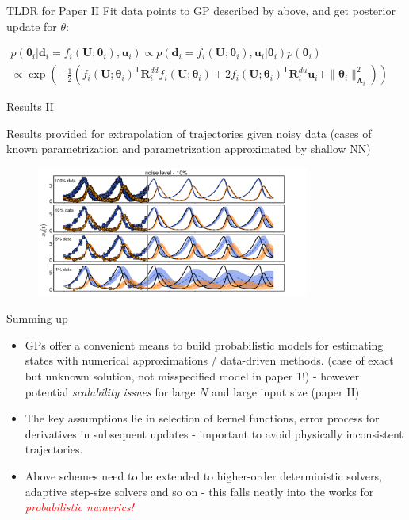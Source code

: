\documentclass[usenames,dvipsnames]{beamer}
\theoremstyle{definition}
\begin{document}
\begin{frame}{TLDR for Paper II}
    Fit data points to GP described by above, and get posterior update for $\theta$:

    $\begin{gathered}p\left(\boldsymbol{\theta}_i|\mathbf{d}_i=f_i(\mathbf{U};\boldsymbol{\theta}_i),\mathbf{u}_i\right)\propto p\left(\mathbf{d}_i=f_i(\mathbf{U};\boldsymbol{\theta}_i),\mathbf{u}_i|\left.\boldsymbol{\theta}_i\right)p(\boldsymbol{\theta}_i)\right.\\\propto \exp\left(-\frac12\left(f_i(\mathbf{U};\boldsymbol{\theta}_i)^\mathsf{T}\mathbf{R}_i^{dd}f_i(\mathbf{U};\boldsymbol{\theta}_i)+2f_i(\mathbf{U};\boldsymbol{\theta}_i)^\mathsf{T}\mathbf{R}_i^{du}\mathbf{u}_i+\|\boldsymbol{\theta}_i\|_{\boldsymbol{\Lambda}_i}^2\right)\right)\end{gathered}$
    
\end{frame}

\begin{frame}{Results II}
    
Results provided for extrapolation of trajectories given noisy data (cases of known parametrization and parametrization approximated by shallow NN)

\begin{figure}
    \centering
    \includegraphics[width=0.8\textwidth]{noisy_data_reconstruction.png}
    \label{f: noisy_uc}
\end{figure}
\end{frame}

\begin{frame}{Summing up}
\begin{itemize}
\item GPs offer a convenient means to build probabilistic models for estimating states with numerical approximations / data-driven methods. (case of exact but unknown solution, not misspecified model in paper 1!) - however potential \emph{scalability issues} for large $N$ and large input size (paper II)

\item The key assumptions lie in selection of kernel functions, error process for derivatives in subsequent updates - important to avoid physically inconsistent trajectories.

\item Above schemes need to be extended to higher-order deterministic solvers, adaptive step-size solvers and so on - this falls neatly into the works for \textcolor{red}{\emph{probabilistic numerics!}}
\end{itemize}
\end{frame}
\end{document}
